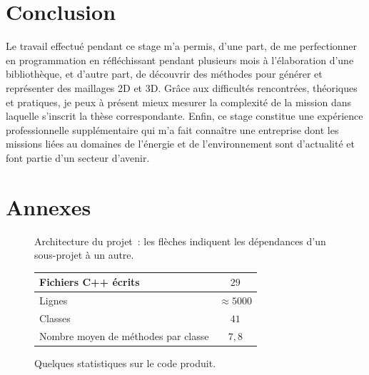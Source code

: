 \documentclass[12pt,a4paper]{report}
\begin{document}
\newpage
\section{Conclusion}

Le travail effectué pendant ce stage m'a permis, d'une part, de me perfectionner en programmation en réfléchissant pendant plusieurs mois à l'élaboration d'une bibliothèque, et d'autre part, de découvrir des méthodes pour générer et représenter des maillages 2D et 3D.
Grâce aux difficultés rencontrées, théoriques et pratiques, je peux à présent mieux mesurer la complexité de la mission dans laquelle s'inscrit la thèse correspondante.
Enfin, ce stage constitue une expérience professionnelle supplémentaire qui m'a fait connaître une entreprise dont les missions liées au domaines de l'énergie et de l'environnement sont d'actualité et font partie d'un secteur d'avenir.

\newpage
\section{Annexes}

\begin{figure}[htbp]
\begin{center}
\usetikzlibrary {shapes.geometric}
\caption{Architecture du projet~: les flèches indiquent les dépendances d'un sous-projet à un autre.}
\label{archi}
\end{center}
\end{figure}

\begin{figure}
\begin{center}
\begin{tabular}{|l|c|}\hline
Fichiers C++ écrits & $29$ \\\hline
Lignes & $\approx 5000$\\\hline
Classes & $41$\\\hline
Nombre moyen de méthodes par classe & $7,8$\\\hline
\end{tabular}
\caption{Quelques statistiques sur le code produit.}
\label{stats}
\end{center}
\end{figure}
\clearpage
\end{document}
